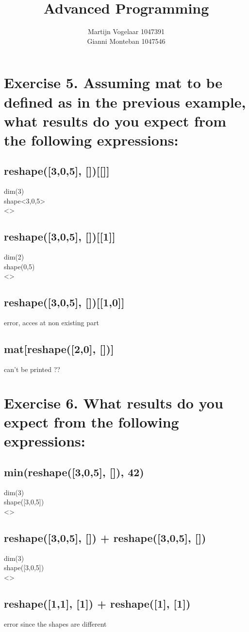 \documentclass[a4paper]{article}
\title{Advanced Programming }
\author{Martijn Vogelaar 1047391 \\ Gianni Monteban 1047546}
\begin{document}
\maketitle

\section*{Exercise 5. Assuming mat to be defined as in the previous example, what results do you expect from the following expressions:}
\subsection*{reshape([3,0,5], [])[[]]}
dim(3)\\
shape<3,0,5>\\
<>
\subsection*{reshape([3,0,5], [])[[1]]}
dim(2)\\
shape(0,5)\\
<>
\subsection*{reshape([3,0,5], [])[[1,0]]}
error, acces at non existing part
\subsection*{mat[reshape([2,0], [])]}
can't be printed ??
\section*{Exercise 6. What results do you expect from the following expressions:}
\subsection*{min(reshape([3,0,5], []), 42)}
dim(3)\\
shape([3,0,5])\\
<>
\subsection*{reshape([3,0,5], []) + reshape([3,0,5], [])}
dim(3)\\
shape([3,0,5])\\
<>
\subsection*{reshape([1,1], [1]) + reshape([1], [1])}
error since the shapes are different
\end{document}

